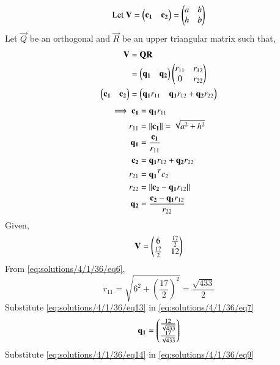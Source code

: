 \begin{equation}\label{eq:solutions/4/1/36/eq1}
	\text{Let } \mathbf{V} = \begin{pmatrix}\mathbf{c_1} & \mathbf{c_2}\end{pmatrix} = \begin{pmatrix}a & h\\h & b\end{pmatrix}
\end{equation}
Let $\vec{Q}$ be an orthogonal and $\vec{R}$ be an upper triangular matrix such that, 
\begin{align}
	\label{eq:solutions/4/1/36/eq2}\mathbf{V} &= \mathbf{Q}\mathbf{R}\\
	\label{eq:solutions/4/1/36/eq3}&= \begin{pmatrix}\mathbf{q_1} & \mathbf{q_2}\end{pmatrix}\begin{pmatrix}r_{11} & r_{12}\\0 & r_{22}\end{pmatrix}\\
	\label{eq:solutions/4/1/36/eq4}\begin{pmatrix}\mathbf{c_1} & \mathbf{c_2}\end{pmatrix} &= \begin{pmatrix}\mathbf{q_1}r_{11} & \mathbf{q_1}r_{12} + \mathbf{q_2}r_{22}\end{pmatrix}
\end{align}
\begin{align}
	\label{eq:solutions/4/1/36/eq5}\implies\mathbf{c_1} &= \mathbf{q_1}r_{11}\\
	\label{eq:solutions/4/1/36/eq6}r_{11} &= \left\lVert\mathbf{c_1}\right\rVert = \sqrt{a^2 + h^2}\\
	\label{eq:solutions/4/1/36/eq7}\mathbf{q_1} &= \frac{\mathbf{c_1}}{r_{11}}\\
	\label{eq:solutions/4/1/36/eq8}\mathbf{c_2} &= \mathbf{q_1}r_{12} + \mathbf{q_2}r_{22}\\
	\label{eq:solutions/4/1/36/eq9}r_{21} &= \mathbf{q_1}^Tc_2\\
	\label{eq:solutions/4/1/36/eq10}r_{22} &= \left\lVert\mathbf{c_2} - \mathbf{q_{1}}r_{12}\right\rVert\\
	\label{eq:solutions/4/1/36/eq11}\mathbf{q_2} &= \frac{\mathbf{c_2} - \mathbf{q_{1}}r_{12}}{r_{22}}
\end{align}
Given,
\begin{equation}\label{eq:solutions/4/1/36/eq12}
	\mathbf{V} = \begin{pmatrix}6 & \frac{17}{2}\\ \frac{17}{2} & 12\end{pmatrix}
\end{equation}
From \eqref{eq:solutions/4/1/36/eq6},
\begin{equation}\label{eq:solutions/4/1/36/eq13}
	r_{11} = \sqrt{6^2 + \left(\frac{17}{2}\right)^2} = \frac{\sqrt{433}}{2}
\end{equation}
Substitute \eqref{eq:solutions/4/1/36/eq13} in \eqref{eq:solutions/4/1/36/eq7}
\begin{equation}\label{eq:solutions/4/1/36/eq14}
	\mathbf{q_1} = \begin{pmatrix}\frac{12}{\sqrt{433}} \\ \frac{17}{\sqrt{433}}\end{pmatrix}
\end{equation}
Substitute \eqref{eq:solutions/4/1/36/eq14} in \eqref{eq:solutions/4/1/36/eq9}
